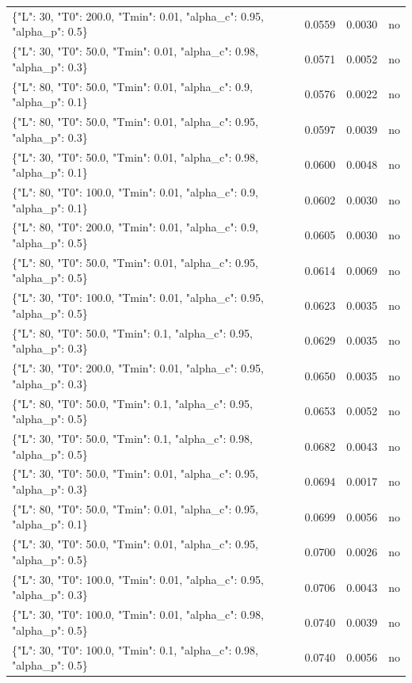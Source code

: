\begin{table}[htbp]
\begin{tabular}{lrrr}
\{"L": 30, "T0": 200.0, "Tmin": 0.01, "alpha\_c": 0.95, "alpha\_p": 0.5\} & 0.0559 & 0.0030 & no \\
\{"L": 30, "T0": 50.0, "Tmin": 0.01, "alpha\_c": 0.98, "alpha\_p": 0.3\} & 0.0571 & 0.0052 & no \\
\{"L": 80, "T0": 50.0, "Tmin": 0.01, "alpha\_c": 0.9, "alpha\_p": 0.1\} & 0.0576 & 0.0022 & no \\
\{"L": 80, "T0": 50.0, "Tmin": 0.01, "alpha\_c": 0.95, "alpha\_p": 0.3\} & 0.0597 & 0.0039 & no \\
\{"L": 30, "T0": 50.0, "Tmin": 0.01, "alpha\_c": 0.98, "alpha\_p": 0.1\} & 0.0600 & 0.0048 & no \\
\{"L": 80, "T0": 100.0, "Tmin": 0.01, "alpha\_c": 0.9, "alpha\_p": 0.1\} & 0.0602 & 0.0030 & no \\
\{"L": 80, "T0": 200.0, "Tmin": 0.01, "alpha\_c": 0.9, "alpha\_p": 0.5\} & 0.0605 & 0.0030 & no \\
\{"L": 80, "T0": 50.0, "Tmin": 0.01, "alpha\_c": 0.95, "alpha\_p": 0.5\} & 0.0614 & 0.0069 & no \\
\{"L": 30, "T0": 100.0, "Tmin": 0.01, "alpha\_c": 0.95, "alpha\_p": 0.5\} & 0.0623 & 0.0035 & no \\
\{"L": 80, "T0": 50.0, "Tmin": 0.1, "alpha\_c": 0.95, "alpha\_p": 0.3\} & 0.0629 & 0.0035 & no \\
\{"L": 30, "T0": 200.0, "Tmin": 0.01, "alpha\_c": 0.95, "alpha\_p": 0.3\} & 0.0650 & 0.0035 & no \\
\{"L": 80, "T0": 50.0, "Tmin": 0.1, "alpha\_c": 0.95, "alpha\_p": 0.5\} & 0.0653 & 0.0052 & no \\
\{"L": 30, "T0": 50.0, "Tmin": 0.1, "alpha\_c": 0.98, "alpha\_p": 0.5\} & 0.0682 & 0.0043 & no \\
\{"L": 30, "T0": 50.0, "Tmin": 0.01, "alpha\_c": 0.95, "alpha\_p": 0.3\} & 0.0694 & 0.0017 & no \\
\{"L": 80, "T0": 50.0, "Tmin": 0.01, "alpha\_c": 0.95, "alpha\_p": 0.1\} & 0.0699 & 0.0056 & no \\
\{"L": 30, "T0": 50.0, "Tmin": 0.01, "alpha\_c": 0.95, "alpha\_p": 0.5\} & 0.0700 & 0.0026 & no \\
\{"L": 30, "T0": 100.0, "Tmin": 0.01, "alpha\_c": 0.95, "alpha\_p": 0.3\} & 0.0706 & 0.0043 & no \\
\{"L": 30, "T0": 100.0, "Tmin": 0.01, "alpha\_c": 0.98, "alpha\_p": 0.5\} & 0.0740 & 0.0039 & no \\
\{"L": 30, "T0": 100.0, "Tmin": 0.1, "alpha\_c": 0.98, "alpha\_p": 0.5\} & 0.0740 & 0.0056 & no \\

\end{tabular}
\end{table}
